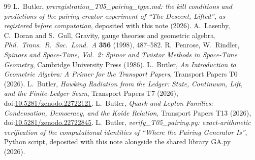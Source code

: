 \documentclass[11pt]{article}
\theoremstyle{definition}
\theoremstyle{plain}
\begin{document}
\begin{thebibliography}{99}
 L.~Butler,
\emph{preregistration\_T05\_pairing\_type.md: the kill conditions and predictions of the pairing-creator experiment of ``The Descent, Lifted'', as registered before computation},
deposited with this note (2026).
 A.~Lasenby, C.~Doran and S.~Gull,
Gravity, gauge theories and geometric algebra,
\emph{Phil.\ Trans.\ R.\ Soc.\ Lond.\ A} \textbf{356} (1998), 487--582.
 R.~Penrose, W.~Rindler,
\emph{Spinors and Space-Time, Vol.~2: Spinor and Twistor Methods in Space-Time Geometry},
Cambridge University Press (1986).
 L.~Butler,
\emph{An Introduction to Geometric Algebra: A Primer for the Transport Papers},
Transport Papers T0 (2026).
 L.~Butler,
\emph{Hawking Radiation from the Ledger: State, Continuum, Lift, and the Finite-Ledger Seam},
Transport Papers T7 (2026), doi:\href{https://doi.org/10.5281/zenodo.22722121}{10.5281/zenodo.22722121}.
 L.~Butler,
\emph{Quark and Lepton Families: Condensation, Democracy, and the Koide Relation},
Transport Papers T13 (2026), doi:\href{https://doi.org/10.5281/zenodo.22722845}{10.5281/zenodo.22722845}.
 L.~Butler,
\emph{verify\_T05\_pairing.py: exact-arithmetic verification of the computational identities of ``Where the Pairing Generator Is''},
Python script, deposited with this note alongside the shared library GA.py (2026).
\end{thebibliography}
\end{document}
